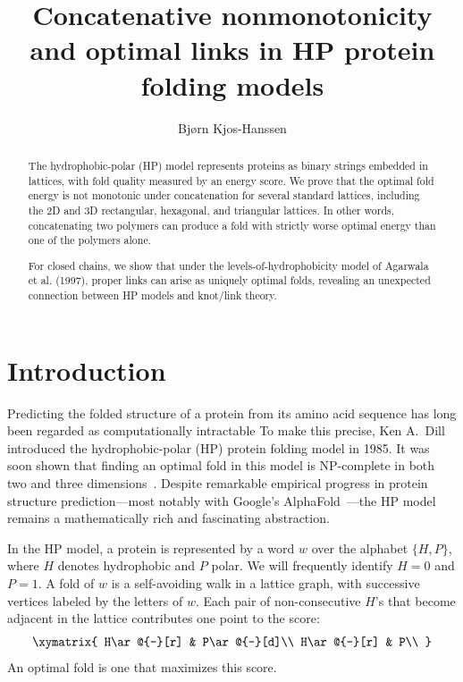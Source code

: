 \documentclass{article}
\begin{document}
\title{Concatenative nonmonotonicity and optimal links in HP protein folding models}
\author{Bj{\o}rn Kjos-Hanssen}

\maketitle

\begin{abstract}
	The hydrophobic-polar (HP) model represents proteins as binary strings embedded in lattices, with fold quality measured by an energy score.
	We prove that the optimal fold energy is not monotonic under concatenation
	for several standard lattices, including the 2D and 3D rectangular, hexagonal, and triangular lattices.
	In other words, concatenating two polymers can produce a fold with strictly worse optimal energy than one of the polymers alone.
	
	For closed chains, we show that under the levels-of-hydrophobicity model of Agarwala et al. (1997), proper links can arise as uniquely optimal folds,
	revealing an unexpected connection between HP models and knot/link theory.
\end{abstract}

\section{Introduction}\label{sec:intro}
	Predicting the folded structure of a protein from its amino acid sequence has long been regarded as computationally intractable
	To make this precise, Ken A.~Dill~\cite{doi:10.1021/bi00327a032} introduced the hydrophobic-polar (HP) protein folding model in 1985.
	It was soon shown that finding an optimal fold in this model is NP-complete in both two and three dimensions~\cite{CGPPY:98,10.1145/279069.279080}.
	Despite remarkable empirical progress in protein structure prediction---most notably with Google's AlphaFold~\cite{alphafold}---the HP model
	remains a mathematically rich and fascinating abstraction.


	In the HP model, a protein is represented by a word $w$ over the alphabet $\{H,P\}$, where $H$ denotes hydrophobic and $P$ polar.  
	We will frequently identify $H=0$ and $P=1$.  
	A fold of $w$ is a self-avoiding walk in a lattice graph, with successive vertices labeled by the letters of $w$.  
	Each pair of non-consecutive $H$’s that become adjacent in the lattice contributes one point to the score:
	\[
	\xymatrix{
	H\ar@{-}[r] & P\ar@{-}[d]\\
	H\ar@{-}[r] & P\\		
	}
	\]
	An optimal fold is one that maximizes this score.
\end{document}
